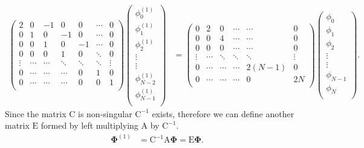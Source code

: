 \documentclass[a4paper, 12pt, twoside, openright]{article}
\numberwithin{equation}{section}
\begin{document}
\begin{align}
\begin{pmatrix}
2 & 0 & -1 & 0 & 0 & \cdots & 0 \\
0 & 1 & 0 & -1 & 0 & \cdots & 0 \\
0 & 0 & 1 & 0 & -1 & \cdots & 0 \\
0 & 0 & 0 & 1 & 0 & \ddots & 0\\ 
\vdots & \cdots & \cdots & \ddots & \ddots & \ddots & \vdots \\
0 & \cdots & \cdots & \cdots  & 0 & 1 & 0 \\ 
0 & \cdots & \cdots & \cdots & 0 & 0 & 1 \\
\end{pmatrix} 
\begin{pmatrix}
 \phi_0^{(1)} \\
\phi_1^{(1)} \\
\phi_2^{(1)} \\
\vdots \\
\vdots \\
\phi_{N-2}^{(1)} \\
\phi_{N-1}^{(1)} \\ 
\end{pmatrix}
&=
\begin{pmatrix}
0 & 2 & 0 & \cdots & \cdots & 0 \\
0 & 0 & 4 & \cdots & \cdots & 0 \\
0 & 0 & 0 &\cdots & \cdots & 0 \\
\vdots & \cdots & \ddots & \ddots & \ddots & \vdots \\
0 & \cdots & \cdots  & \cdots & 2(N-1) & 0 \\ 
0 & \cdots & \cdots & \cdots & 0 & 2N \\
\end{pmatrix} 
\begin{pmatrix}
 \phi_0 \\
\phi_1 \\
\phi_2 \\
\vdots \\
\vdots \\
\phi_{N-1} \\
\phi_{N} \\ 
\end{pmatrix}.
\end{align}
Since the matrix $\mathrm{C}$ is non-singular $\mathrm{C}^{-1}$ exists, therefore we can define another matrix $\mathrm{E}$ formed by left multiplying $\mathrm{A}$ by $\mathrm{C}^{-1}$.
\begin{align}
\mathbf{\Phi}^{(1)} &= \mathrm{C}^{-1}\mathrm{A}\mathbf{\Phi} = \mathrm{E}\mathbf{\Phi}.
\end{align}
\end{document}
